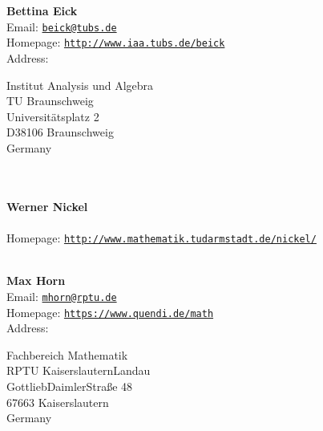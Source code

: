 \documentclass[a4paper,11pt]{report}
\begin{document}
\begin{titlepage}
\mbox{}\\
{\mbox{}\\
\small \noindent \textbf{ Bettina Eick\\
    }  Email: \href{mailto://beick@tu-bs.de} {\texttt{beick@tu\texttt{}bs.de}}\\
  Homepage: \href{http://www.iaa.tu-bs.de/beick} {\texttt{http://www.iaa.tu\texttt{}bs.de/beick}}\\
  Address: \begin{minipage}[t]{8cm}\noindent
 Institut Analysis und Algebra\\
 TU Braunschweig\\
 Universit{\"a}tsplatz 2\\
 D\texttt{}38106 Braunschweig\\
 Germany\\
 \end{minipage}
}\\
{\mbox{}\\
\small \noindent \textbf{ Werner Nickel\\
  }\\
  Homepage: \href{http://www.mathematik.tu-darmstadt.de/~nickel/} {\texttt{http://www.mathematik.tu\texttt{}darmstadt.de/\texttt{}nickel/}}}\\
{\mbox{}\\
\small \noindent \textbf{ Max Horn\\
    }  Email: \href{mailto://mhorn@rptu.de} {\texttt{mhorn@rptu.de}}\\
  Homepage: \href{https://www.quendi.de/math} {\texttt{https://www.quendi.de/math}}\\
  Address: \begin{minipage}[t]{8cm}\noindent
 Fachbereich Mathematik\\
 RPTU Kaiserslautern\texttt{}Landau\\
 Gottlieb\texttt{}Daimler\texttt{}Stra{\ss}e 48\\
 67663 Kaiserslautern\\
 Germany\\
 \end{minipage}
}\\
\end{titlepage}
\end{document}
